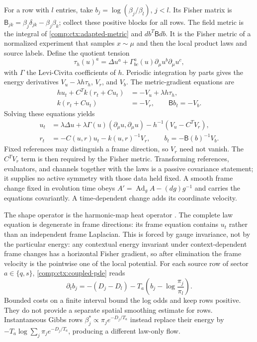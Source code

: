 For a row with $l$ entries, take $b_j=\log(\beta_j/\beta_l)$, $j<l$. Its Fisher matrix is $\mathsf B_{jk}=\beta_j\delta_{jk}-\beta_j\beta_k$; collect these positive blocks for all rows. The field metric is the integral of \cref{comp:ctx:adapted-metric} and $db^T\mathsf Bdb$. It is the Fisher metric of a normalized experiment that samples $x\sim\mu$ and then the local product laws and source labels. Define the quotient tension
\begin{equation}
 \tau_h(u)^a=\Delta u^a+
          \Gamma^a_{bc}(u)\partial_\mu u^b\partial_\mu u^c,
 \label{comp:ctx:tension}
\end{equation}
with $\Gamma$ the Levi-Civita coefficients of $h$. Periodic integration by parts gives the energy derivatives $V_u-\lambda h\tau_h$, $V_r$, and $V_b$. The metric-gradient equations are
\begin{equation}
 \begin{aligned}
 h u_t+C^Tk(r_t+Cu_t)&=-V_u+\lambda h\tau_h,\\
 k(r_t+Cu_t)&=-V_r,\qquad \mathsf B b_t=-V_b.
 \end{aligned}
\end{equation}
Solving these equations yields
\begin{equation}
 \begin{aligned}
 u_t&=\lambda\Delta u+\lambda\Gamma(u)(\partial_\mu u,\partial_\mu u)
                           -h^{-1}(V_u-C^TV_r),\\
 r_t&=-C(u,r)u_t-k(u,r)^{-1}V_r,\qquad
 b_t=-\mathsf B(b)^{-1}V_b.
 \end{aligned}
 \label{comp:ctx:coupled-pde}
\end{equation}
Fixed references may distinguish a frame direction, so $V_r$ need not vanish. The $C^TV_r$ term is then required by the Fisher metric. Transforming references, evaluators, and channels together with the laws is a passive covariance statement; it supplies no active symmetry with those data held fixed. A smooth frame change fixed in evolution time obeys $A'=\operatorname{Ad}_gA-(dg)g^{-1}$ and carries the equations covariantly. A time-dependent change adds its coordinate velocity.

The shape operator is the harmonic-map heat operator \citep{EellsSampson1964}. The complete law equation is degenerate in frame directions: its frame equation contains $u_t$ rather than an independent frame Laplacian. This is forced by gauge invariance, not by the particular energy: any contextual energy invariant under context-dependent frame changes has a horizontal Fisher gradient, so after elimination the frame velocity is the pointwise one of the local potential. For each source row of sector $a\in\{q,s\}$, \cref{comp:ctx:coupled-pde} reads
\begin{equation}
 \partial_t b_j=-(D_j-D_l)
       -T_a\left(b_j-\log\frac{\pi_j}{\pi_l}\right).
 \label{comp:ctx:log-odds}
\end{equation}
Bounded costs on a finite interval bound the log odds and keep rows positive. They do not provide a separate spatial smoothing estimate for rows. Instantaneous Gibbs rows $\beta_j^*\propto\pi_j e^{-D_j/T_a}$ instead replace their energy by $-T_a\log\sum_j\pi_j e^{-D_j/T_a}$, producing a different law-only flow.

